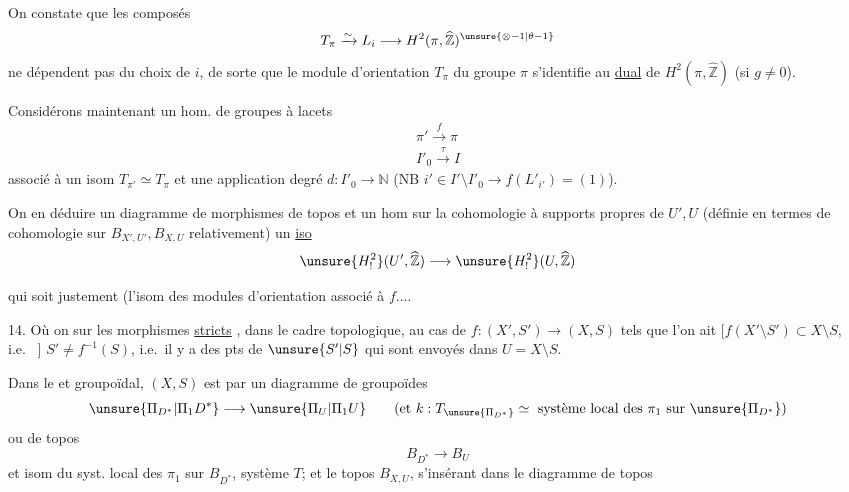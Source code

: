 
On constate que les composés
\[
T_\pi \xrightarrow{\sim} L_i \longrightarrow
H^2(\pi,\widehat{\mathbb Z})^{\unsure{\otimes-1|\theta-1}}
\]
ne dépendent pas du choix de $i$, de sorte que le module d'orientation $T_\pi$ du groupe   $\pi$ s'identifie au \uline{dual} de $H^2(\pi,\widehat{\mathbb Z})$ (si $g\ne0$).

Considérons maintenant un hom. de groupes à lacets
\[
\begin{gathered}
\pi'\xrightarrow{f}\pi\\
I'_0\xrightarrow{\tau}I
\end{gathered}
\]
associé à un isom $T_{\pi'}\simeq T_\pi$ et une application degré
$d:I'_0\longrightarrow\mathbb N$
(NB $i'\in I'\setminus I'_0\longrightarrow f(L'_{i'})=(1)$).

On  en déduire un diagramme de morphismes de topos
et un hom \uline{} sur la cohomologie à supports propres de $U',U$ (définie en termes de cohomologie sur $B_{X',U'}, B_{X,U}$ relativement)
   un \uline{iso}
\[
\unsure{H^2_!}(U',\widehat{\mathbb Z})\longrightarrow
\unsure{H^2_!}(U,\widehat{\mathbb Z})
\]


qui soit justement  (l'isom des modules d'orientation associé à $f$....

14. Où on  sur les morphismes  \uline{stricts} , dans le cadre topologique, au cas de
$f:(X',S')\longrightarrow(X,S)$ tels que l'on ait
$[f(X'\setminus S')\subset X\setminus S$, i.e.\  $]$
 $S'\ne f^{-1}(S)$, i.e.\ il y a des pts de $\unsure{S'|S}$ qui sont envoyés dans $U=X\setminus S$.

Dans le    et groupoïdal, $(X,S)$ est   par un diagramme de groupoïdes
\[
\unsure{\Pi_{D^*}|\Pi_1 D^*}\longrightarrow\unsure{\Pi_U|\Pi_1 U}
\qquad
(\text{et }k:T_{\unsure{\Pi_{D^*}}}\simeq
\text{ système local des }\pi_1\text{ sur }\unsure{\Pi_{D^*}})
\]
ou de topos
\[
B_{D^*}\longrightarrow B_U
\]
et  isom  du syst. local des $\pi_1$ sur $B_{D^*}$,  système   $T$;
et le topos $B_{X,U}$, s'insérant dans le diagramme  de topos

